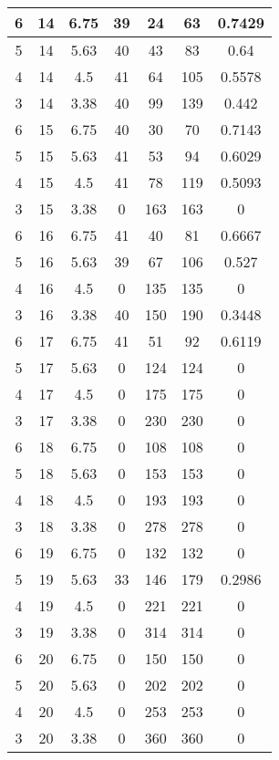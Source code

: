 \documentclass[letterpaper, 12pt]{article}
\begin{document}
\begin{longtable}{|c|c|c|c|c|c|c|}
6 & 14 & 6.75 & 39 & 24 & 63 & 0.7429 \\
\hline
5 & 14 & 5.63 & 40 & 43 & 83 & 0.64 \\
\hline
4 & 14 & 4.5 & 41 & 64 & 105 & 0.5578 \\
\hline
3 & 14 & 3.38 & 40 & 99 & 139 & 0.442 \\
\hline
6 & 15 & 6.75 & 40 & 30 & 70 & 0.7143 \\
\hline
5 & 15 & 5.63 & 41 & 53 & 94 & 0.6029 \\
\hline
4 & 15 & 4.5 & 41 & 78 & 119 & 0.5093 \\
\hline
3 & 15 & 3.38 & 0 & 163 & 163 & 0 \\
\hline
6 & 16 & 6.75 & 41 & 40 & 81 & 0.6667 \\
\hline
5 & 16 & 5.63 & 39 & 67 & 106 & 0.527 \\
\hline
4 & 16 & 4.5 & 0 & 135 & 135 & 0 \\
\hline
3 & 16 & 3.38 & 40 & 150 & 190 & 0.3448 \\
\hline
6 & 17 & 6.75 & 41 & 51 & 92 & 0.6119 \\
\hline
5 & 17 & 5.63 & 0 & 124 & 124 & 0 \\
\hline
4 & 17 & 4.5 & 0 & 175 & 175 & 0 \\
\hline
3 & 17 & 3.38 & 0 & 230 & 230 & 0 \\
\hline
6 & 18 & 6.75 & 0 & 108 & 108 & 0 \\
\hline
5 & 18 & 5.63 & 0 & 153 & 153 & 0 \\
\hline
4 & 18 & 4.5 & 0 & 193 & 193 & 0 \\
\hline
3 & 18 & 3.38 & 0 & 278 & 278 & 0 \\
\hline
6 & 19 & 6.75 & 0 & 132 & 132 & 0 \\
\hline
5 & 19 & 5.63 & 33 & 146 & 179 & 0.2986 \\
\hline
4 & 19 & 4.5 & 0 & 221 & 221 & 0 \\
\hline
3 & 19 & 3.38 & 0 & 314 & 314 & 0 \\
\hline
6 & 20 & 6.75 & 0 & 150 & 150 & 0 \\
\hline
5 & 20 & 5.63 & 0 & 202 & 202 & 0 \\
\hline
4 & 20 & 4.5 & 0 & 253 & 253 & 0 \\
\hline
3 & 20 & 3.38 & 0 & 360 & 360 & 0 \\
\hline
\end{longtable}
\end{document}
